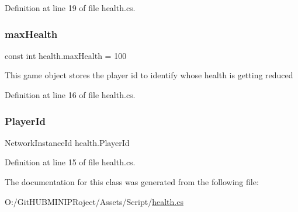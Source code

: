 Definition at line 19 of file health.\+cs.

\mbox{\label{classhealth_a03ad8e4011a7094e3fbec6dcd7ff946c}} 
\subsubsection{\texorpdfstring{maxHealth}{maxHealth}}
{\footnotesize\ttfamily const int health.\+max\+Health = 100}

This game object stores the player id to identify whose health is getting reduced 

Definition at line 16 of file health.\+cs.

\mbox{\label{classhealth_a53480daaacaa8f112112ab692cfb4e00}} 
\subsubsection{\texorpdfstring{PlayerId}{PlayerId}}
{\footnotesize\ttfamily Network\+Instance\+Id health.\+Player\+Id}



Definition at line 15 of file health.\+cs.



The documentation for this class was generated from the following file\+:\begin{DoxyCompactItemize}
\item 
O\+:/\+Git\+H\+U\+B\+M\+I\+N\+I\+P\+Roject/\+Assets/\+Script/\mbox{\hyperlink{health_8cs}{health.\+cs}}\end{DoxyCompactItemize}

